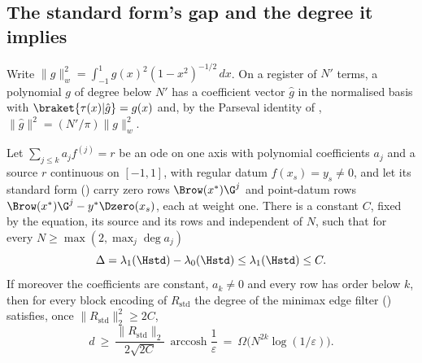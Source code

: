 \subsection{The standard form's gap and the degree it implies}
\label{app:std-gap}

Write $\|g\|_w^2=\int_{-1}^{1}g(x)^2(1-x^2)^{-1/2}\,dx$. On a register of $N'$ terms, a polynomial $g$ of degree below $N'$ has a coefficient vector $\hat g$ in the normalised basis with $\braket{\tau(x)|\hat g}=g(x)$ and, by the Parseval identity of , $\|\hat g\|^2=(N'/\pi)\|g\|_w^2$.

\begin{proposition}
\label{prop:std-gap-bound}
Let $\sum_{j\le k}a_jf^{(j)}=r$ be an \gls{ode} on one axis with polynomial coefficients $a_j$ and a source $r$ continuous on $[-1,1]$, with regular datum $f(x_s)=y_s\ne0$, and let its standard form () carry zero rows $\Brow(x^*)\G^{j}$ and point-datum rows $\Brow(x^*)\G^{j}-y^*\Dzero(x_s)$, each at weight one. There is a constant $C$, fixed by the equation, its source and its rows and independent of $N$, such that for every $N\ge\max(2,\max_j\deg a_j)$
\begin{equation*}
    \Delta=\lambda_1(\Hstd)-\lambda_0(\Hstd)\le\lambda_1(\Hstd)\le C .
\end{equation*}
If moreover the coefficients are constant, $a_k\ne0$ and every row has order below $k$, then for every block encoding of $R_{\mathrm{std}}$ the degree of the minimax edge filter () satisfies, once $\|R_{\mathrm{std}}\|_2^2\ge2C$,
\begin{equation*}
    d\ \ge\ \frac{\|R_{\mathrm{std}}\|_2}{2\sqrt{2C}}\,\operatorname{arccosh}\frac1\varepsilon\ =\ \Omega\bigl(N^{2k}\log(1/\varepsilon)\bigr).
\end{equation*}
\end{proposition}
